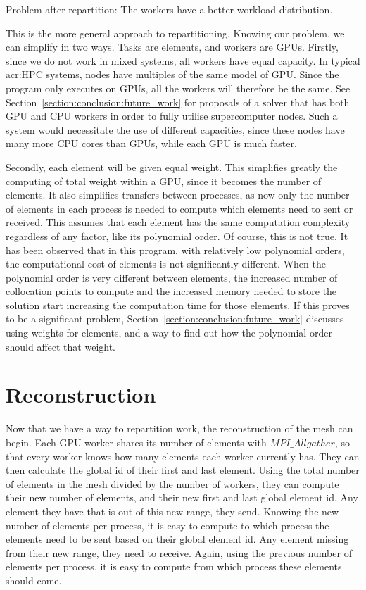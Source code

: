 \begin{table}[H]
\begin{center}
		\caption{Problem after repartition: The workers have a better workload distribution.}
		\label{table:after_repartition}
	\end{center}
\end{table}

This is the more general approach to repartitioning. Knowing our problem, we can simplify in two
ways. Tasks are elements, and workers are GPUs. Firstly, since we do not work in mixed systems, all
workers have equal capacity. In typical \acrshort{acr:HPC} systems, nodes have multiples of the same
model of GPU. Since the program only executes on GPUs, all the workers will therefore be the same.
See Section~\ref{section:conclusion:future_work} for proposals of a solver that has both GPU and CPU
workers in order to fully utilise supercomputer nodes. Such a system would necessitate the use of
different capacities, since these nodes have many more CPU cores than GPUs, while each GPU is much
faster. 

Secondly, each element will be given equal weight. This simplifies greatly the computing of total
weight within a GPU, since it becomes the number of elements. It also simplifies transfers between
processes, as now only the number of elements in each process is needed to compute which elements
need to sent or received. This assumes that each element has the same computation complexity
regardless of any factor, like its polynomial order. Of course, this is not true. It has been
observed that in this program, with relatively low polynomial orders, the computational cost of
elements is not significantly different. When the polynomial order is very different between
elements, the increased number of collocation points to compute and the increased memory needed to
store the solution start increasing the computation time for those elements. If this proves to be a
significant problem, Section~\ref{section:conclusion:future_work} discusses using weights for
elements, and a way to find out how the polynomial order should affect that weight.

\section{Reconstruction} \label{section:load_balancing:reconstruction}

Now that we have a way to repartition work, the reconstruction of the mesh can begin. Each GPU
worker shares its number of elements with $MPI\_Allgather$, so that every worker knows how many
elements each worker currently has. They can then calculate the global id of their first and last
element. Using the total number of elements in the mesh divided by the number of workers, they can
compute their new number of elements, and their new first and last global element id. Any element
they have that is out of this new range, they send. Knowing the new number of elements per process,
it is easy to compute to which process the elements need to be sent based on their global element
id. Any element missing from their new range, they need to receive. Again, using the previous number
of elements per process, it is easy to compute from which process these elements should come. 

